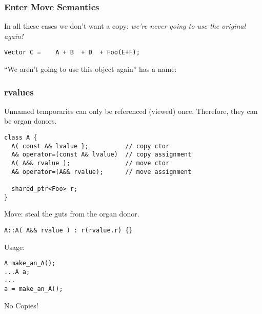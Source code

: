 \begin{frame}[fragile]
\frametitle{Enter Move Semantics}

In all these cases we don't want a copy: \emph{we're never going to
  use the original again!}

\begin{verbatim}
Vector C =    A + B  + D  + Foo(E+F);
\end{verbatim}


``We aren't going to use this object again'' has a name:


\end{frame}
\begin{frame}[fragile]
\frametitle{rvalues}

Unnamed temporaries can only be referenced (viewed) once.  Therefore,
they can be organ donors.

{\scriptsize
\begin{verbatim}
class A {
  A( const A& lvalue };          // copy ctor
  A& operator=(const A& lvalue)  // copy assignment
  A( A&& rvalue );               // move ctor
  A& operator=(A&& rvalue);      // move assignment

  shared_ptr<Foo> r;
}
\end{verbatim}
}

Move: steal the guts from the organ donor.

{\scriptsize
\begin{verbatim}
A::A( A&& rvalue ) : r(rvalue.r) {}
\end{verbatim}
}
Usage:
{\scriptsize
\begin{verbatim}
A make_an_A();
...A a;
...
a = make_an_A();
\end{verbatim}
}
No Copies!
\end{frame}

